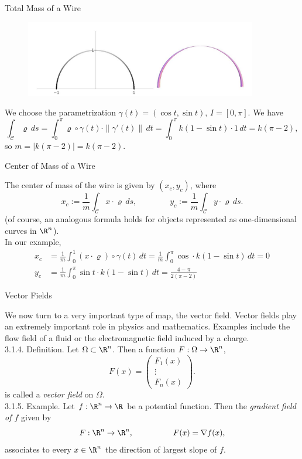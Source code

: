 \documentclass[smaller,hyperref={CJKbookmarks=true}]{beamer}
\begin{document}
\begin{frame}[t]{Total Mass of a Wire}
\begin{spacing}{1}
\begin{figure}
  \centering
  \includegraphics[width=0.9\textwidth]{60.jpg}

\end{figure}
We choose the parametrization $\gamma(t)=(\cos t,\sin t),\,I=[0,\pi]$. We have
\[\int_{\mathcal{C}}\varrho\,ds=\int_{0}^{\pi}
\varrho\circ\gamma(t)\cdot\|\gamma'(t)\|\,dt=
\int_{0}^{\pi}k(1-\sin t)\cdot1\,dt=
k(\pi-2),\]
so $m=|k(\pi-2)|=k(\pi-2)$.
\end{spacing}
\end{frame}
\begin{frame}[t]{Center of Mass of a Wire}
\begin{spacing}{1.05}
The center of mass of the wire is given by $(x_c,y_c)$, where
\[x_c:=\frac{1}{m}\int_{\mathcal{C}}x\cdot
\varrho\,ds,\qquad\qquad y_c:=\frac{1}{m}\int_{\mathcal{C}}y\cdot\varrho
\,ds.\]
(of course, an analogous formula holds for objects represented as
one-dimensional curves in $\R^n$).\\[5pt]
In our example,
\begin{align*}
  x_c &=\frac{1}{m}\int_{0}^{1}(x\cdot\varrho)\circ\gamma
  (t)\,dt=\frac{1}{m}\int_{0}^{\pi}\cos\cdot k(1-\sin t)\,dt=0 \\
  y_c &=\frac{1}{m}\int_{0}^{\pi}\sin t\cdot k(1-\sin t)\,dt=\frac{4-\pi}{2(\pi-2)}
\end{align*}
\end{spacing}
\end{frame}
\begin{frame}[t]{Vector Fields}
\begin{spacing}{1}
We now turn to a very important type of map, the vector field. Vector
fields play an extremely important role in physics and mathematics.
Examples include the flow field of a fluid or the electromagnetic field
induced by a charge.\\[4pt]
\alert{3.1.4. Definition.} Let $\Omega\subset\R^n$. Then a function $F:\Omega\to\R^n$,
\[F(x)=\begin{pmatrix}
         F_1(x) \\
         \vdots \\
         F_n(x)
       \end{pmatrix}.\]
is called a \emph{vector field} on $\Omega$.\\[6pt]
\alert{3.1.5. Example.} Let $f:\R^n\to\R$ be a potential function. Then the \emph{gradient field of $f$} given by
\[F:\R^n\to\R^n,\qquad\qquad\quad F(x)=\nabla f(x),\]
associates to every $x\in\R^n$ the direction of largest slope of $f$.
\end{spacing}
\end{frame}
\end{document}
